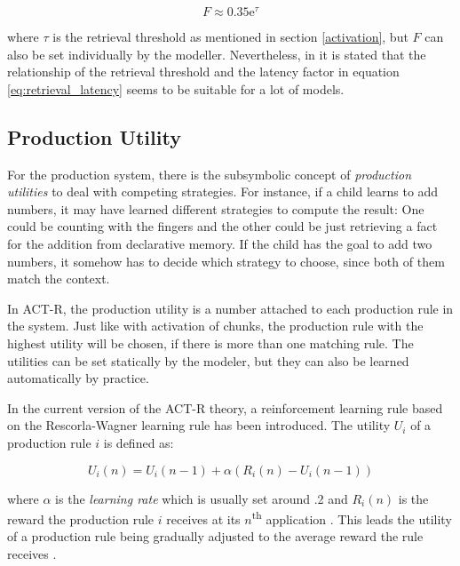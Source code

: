 \begin{equation}
F \approx 0.35\mathrm{e}^\tau
\end{equation}

where $\tau$ is the retrieval threshold as mentioned in section \ref{activation}, but $F$ can also be set individually by the modeller. Nevertheless, in \cite[1042]{anderson_integrated_2004} it is stated that the relationship of the retrieval threshold and the latency factor in equation \eqref{eq:retrieval_latency} seems to be suitable for a lot of models.

\subsection{Production Utility}
\label{production_utility}

For the production system, there is the subsymbolic concept of \emph{production utilities} to deal with competing strategies. For instance, if a child learns to add numbers, it may have learned different strategies to compute the result: One could be counting with the fingers and the other could be just retrieving a fact for the addition from declarative memory. If the child has the goal to add two numbers, it somehow has to decide which strategy to choose, since both of them match the context.

In ACT-R, the production utility is a number attached to each production rule in the system. Just like with activation of chunks, the production rule with the highest utility will be chosen, if there is more than one matching rule. The utilities can be set statically by the modeler, but they can also be learned automatically by practice.

In the current version of the ACT-R theory, a reinforcement learning rule based on the Rescorla-Wagner learning rule \cite{rescorla_wagner_1972} has been introduced. The utility $U_i$ of a production rule $i$ is defined as:

\begin{equation}
\label{eq:utility_learning}
U_i(n) = U_i(n - 1) + \alpha \left(R_i(n) - U_i(n - 1)\right)
\end{equation}

where $\alpha$ is the \emph{learning rate} which is usually set around .2 and $R_i(n)$ is the reward the production rule $i$ receives at its $n$\textsuperscript{th} application \cite[160--161]{anderson_how_2007}. This leads the utility of a production rule being gradually adjusted to the average reward the rule receives \cite[6--7]{actr_tutorial}. 

